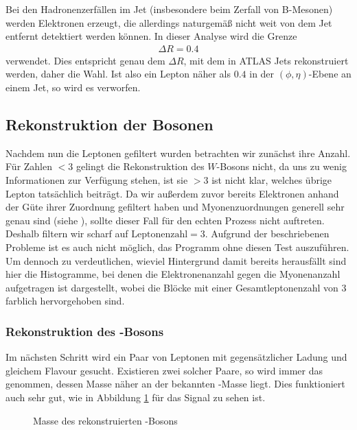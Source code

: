 Bei den Hadronenzerfällen im Jet (insbesondere beim Zerfall von B-Mesonen)
werden Elektronen erzeugt, die allerdings naturgemäß nicht weit von dem Jet
entfernt detektiert werden können. In dieser Analyse wird die Grenze
\begin{align}
  \Delta R = 0.4
\end{align}
verwendet. Dies entspricht genau dem $\Delta R$, mit dem in ATLAS Jets
rekonstruiert werden\cite{jet-recon}, daher die Wahl. Ist also ein Lepton näher
als $0.4$ in der $(\phi, \eta)$-Ebene an einem Jet, so wird es verworfen.

\subsection{Rekonstruktion der Bosonen}
Nachdem nun die Leptonen gefiltert wurden betrachten wir zunächst ihre Anzahl.
Für Zahlen $< 3$ gelingt die Rekonstruktion des $W$-Bosons nicht, da uns zu
wenig Informationen zur Verfügung stehen, ist sie $> 3$ ist nicht klar, welches
übrige Lepton tatsächlich beiträgt. Da wir außerdem zuvor bereits Elektronen
anhand der Güte ihrer Zuordnung gefiltert haben und Myonenzuordnungen generell
sehr genau sind (siehe \cite{myon-zuordnung}), sollte dieser Fall für den echten
Prozess nicht auftreten. Deshalb filtern wir scharf auf $\text{Leptonenzahl} =
3$. Aufgrund der beschriebenen Probleme ist es auch nicht möglich, das Programm
ohne diesen Test auszuführen. Um dennoch zu verdeutlichen, wieviel Hintergrund
damit bereits herausfällt sind hier die Histogramme, bei denen die
Elektronenanzahl gegen die Myonenanzahl aufgetragen ist dargestellt, wobei die
Blöcke mit einer Gesamtleptonenzahl von 3 farblich hervorgehoben sind.

\subsubsection{Rekonstruktion des \Z-Bosons}
Im nächsten Schritt wird ein Paar von Leptonen mit gegensätzlicher Ladung und
gleichem Flavour gesucht. Existieren zwei solcher Paare, so wird immer das
genommen, dessen Masse näher an der bekannten \Z-Masse liegt. Dies funktioniert
auch sehr gut, wie in Abbildung \ref{fig:signal_zmasse} für das Signal zu sehen
ist.
\begin{figure}[h]
  \begin{center}
    
  \end{center}
  \caption{Masse des rekonstruierten \Z-Bosons}
  \label{fig:signal_zmasse}
\end{figure}

